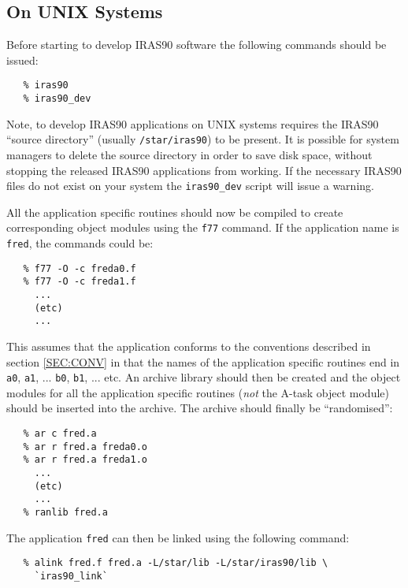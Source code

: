 {\subsection{On UNIX Systems}
Before starting to develop {\small IRAS90} software the following commands 
should be issued:

\small
\begin{verbatim}
   % iras90
   % iras90_dev
\end{verbatim}
\normalsize

Note, to develop {\small IRAS90} applications on {\small UNIX} systems requires
the {\small IRAS90} ``source directory'' (usually \verb+/star/iras90+) to be
present. It is possible for system managers to delete the source directory in
order to save disk space, without stopping the released {\small IRAS90}
applications from working. If the necessary {\small IRAS90} files do not exist
on your system the \verb+iras90_dev+ script will issue a warning. 

All the application specific routines should now be compiled to create
corresponding object modules using the \verb+f77+ command. If the application
name is \verb+fred+, the commands could be: 

\small 
\begin{verbatim}
   % f77 -O -c freda0.f
   % f77 -O -c freda1.f
     ...  
     (etc)
     ...
\end{verbatim}
\normalsize

This assumes that the application conforms to the conventions described in
section \ref{SEC:CONV} in that the names of the application specific routines
end in \verb+a0+, \verb+a1+, ... \verb+b0+, \verb+b1+, ... etc. An archive
library should then be created and the object modules for all the application
specific routines ({\em not} the A-task object module) should be inserted into
the archive. The archive should finally be ``randomised'': 

\small 
\begin{verbatim}
   % ar c fred.a
   % ar r fred.a freda0.o
   % ar r fred.a freda1.o
     ...  
     (etc)
     ...
   % ranlib fred.a
\end{verbatim}
\normalsize

The application \verb+fred+ can then be linked using the following command: 

\small
\begin{verbatim}
   % alink fred.f fred.a -L/star/lib -L/star/iras90/lib \
     `iras90_link`
\end{verbatim}
\normalsize

}
